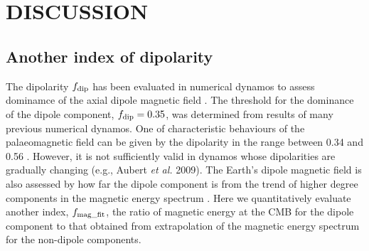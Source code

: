 \section{DISCUSSION}
{\color{red}
\subsection{Another index of dipolarity}
}
\label{subsec:dipolarity}



{\color{red}
The dipolarity $f_{\rm dip}$ has been evaluated in numerical dynamos to assess dominamce of the axial dipole magnetic field \cite{Uli:2006,Soderlund:2012}.
The threshold for the dominance of the dipole component, $f_{\rm dip} = 0.35$, was determined from results of many previous numerical dynamos.
One of characteristic behaviours of the palaeomagnetic field can be given by the dipolarity in the range between 0.34 and 0.56 \cite{Meduri:2021}.
However, it is not sufficiently valid in dynamos whose dipolarities are gradually changing (e.g., Aubert {\it et al.} 2009).
The Earth's dipole magnetic field is also assessed by how far the dipole component is from the trend of higher degree components in the magnetic energy spectrum \cite{Lowes:1974,Langel:1982}.
Here we quantitatively evaluate 
another index, $f_{\rm mag\_fit}$, the ratio of magnetic energy at the CMB for the dipole component to that obtained from extrapolation of the magnetic energy spectrum for the non-dipole components.
}
